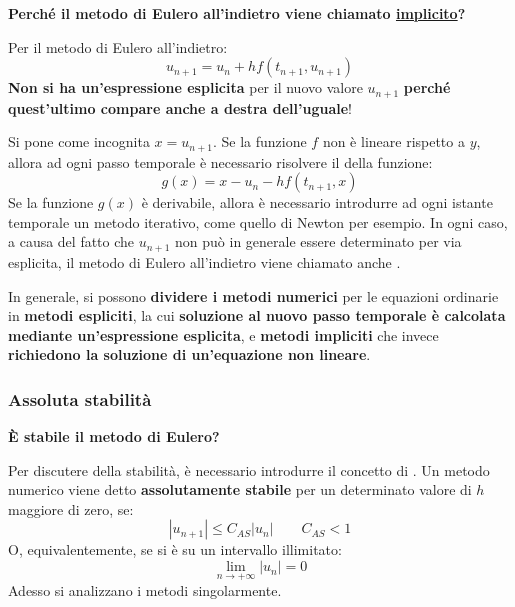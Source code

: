 \highspace
\begin{flushleft}
	\textcolor{Green3}{ \textbf{Perché il metodo di Eulero all'indietro viene chiamato \underline{implicito}?}}
\end{flushleft}
Per il metodo di Eulero all'indietro:
\begin{equation*}
	u_{n+1} = u_{n} + hf\left(t_{n+1}, u_{n+1}\right)
\end{equation*}
\textbf{Non si ha un'espressione esplicita} per il nuovo valore $u_{n+1}$ \textbf{perché quest'ultimo compare anche a destra dell'uguale}!

\highspace
Si pone come incognita $x = u_{n+1}$. Se la funzione $f$ non è lineare rispetto a $y$, allora ad ogni passo temporale è necessario risolvere il  della funzione:
\begin{equation}
	g\left(x\right) = x - u_{n} - hf\left(t_{n+1}, x\right)
\end{equation}
Se la funzione $g\left(x\right)$ è derivabile, allora è necessario introdurre ad ogni istante temporale un metodo iterativo, come quello di Newton per esempio. In ogni caso, a causa del fatto che $u_{n+1}$ non può in generale essere determinato per via esplicita, il metodo di Eulero all'indietro viene chiamato anche .


\highspace
In generale, si possono \textbf{dividere i metodi numerici} per le equazioni ordinarie in \textbf{metodi espliciti}, la cui \textbf{soluzione al nuovo passo temporale è calcolata mediante un'espressione esplicita}, e \textbf{metodi impliciti} che invece \textbf{richiedono la soluzione di un'equazione non lineare}.

\newpage

\subsubsection{Assoluta stabilità}

\begin{flushleft}
	\textcolor{Green3}{ \textbf{È stabile il metodo di Eulero?}}
\end{flushleft}
Per discutere della stabilità, è necessario introdurre il concetto di . Un metodo numerico viene detto \textbf{assolutamente stabile} per un determinato valore di $h$ maggiore di zero, se:
\begin{equation}
	\left|u_{n+1}\right| \le C_{AS}\left|u_{n}\right| \hspace{2em} C_{AS} < 1
\end{equation}
O, equivalentemente, se si è su un intervallo illimitato:
\begin{equation*}
	\lim\limits_{n \rightarrow +\infty} \left|u_{n}\right| = 0
\end{equation*}
Adesso si analizzano i metodi singolarmente.

